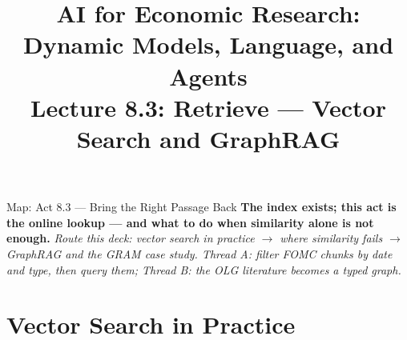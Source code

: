 


\usetikzlibrary{arrows.meta, positioning, shapes, shapes.geometric, fit, calc, backgrounds}

\providecommand{\OLG}{OLG}
\providecommand{\LLM}{\textsc{llm}}
\providecommand{\RAG}{\textsc{rag}}
\providecommand{\GraphRAG}{\textsc{GraphRAG}}

\graphicspath{{./pic/}{./figures/}{../../MiniCourse_8hr/Slides/Module4_Agentic_AI/pic/}{../}}



\title[AI for Econ Research]{AI for Economic Research: Dynamic Models, Language, and Agents\\
Lecture 8.3: Retrieve --- Vector Search and GraphRAG}



\makebeamertitle

\begin{frame}{Map: Act 8.3 --- Bring the Right Passage Back}
\textbf{The index exists; this act is the online lookup --- and what to do when similarity alone is not enough.}
\textit{\footnotesize Route this deck: vector search in practice $\to$ where similarity fails $\to$ GraphRAG and the GRAM case study.
Thread A: filter FOMC chunks by date and type, then query them; Thread B: the OLG literature becomes a typed graph.}
\end{frame}

\section{Vector Search in Practice}

